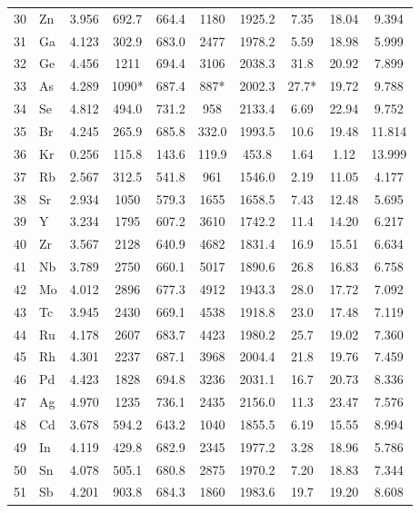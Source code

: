 \documentclass[12pt,a4paper]{article}
\theoremstyle{remark}
\begin{document}
\begin{longtable}{@{}llcccccccc@{}}
		30 & Zn  & 3.956 & 692.7  & 664.4  & 1180   & 1925.2 & 7.35  & 18.04 & 9.394 \\
		31 & Ga  & 4.123 & 302.9  & 683.0  & 2477   & 1978.2 & 5.59  & 18.98 & 5.999 \\
		32 & Ge  & 4.456 & 1211   & 694.4  & 3106   & 2038.3 & 31.8  & 20.92 & 7.899 \\
		33 & As  & 4.289 & 1090*  & 687.4  & 887*   & 2002.3 & 27.7* & 19.72 & 9.788 \\
		34 & Se  & 4.812 & 494.0  & 731.2  & 958    & 2133.4 & 6.69  & 22.94 & 9.752 \\
		35 & Br  & 4.245 & 265.9  & 685.8  & 332.0  & 1993.5 & 10.6  & 19.48 & 11.814 \\
		36 & Kr  & 0.256 & 115.8  & 143.6  & 119.9  & 453.8  & 1.64  & 1.12  & 13.999 \\
		37 & Rb  & 2.567 & 312.5  & 541.8  & 961    & 1546.0 & 2.19  & 11.05 & 4.177 \\
		38 & Sr  & 2.934 & 1050   & 579.3  & 1655   & 1658.5 & 7.43  & 12.48 & 5.695 \\
		39 & Y   & 3.234 & 1795   & 607.2  & 3610   & 1742.2 & 11.4  & 14.20 & 6.217 \\
		40 & Zr  & 3.567 & 2128   & 640.9  & 4682   & 1831.4 & 16.9  & 15.51 & 6.634 \\
		41 & Nb  & 3.789 & 2750   & 660.1  & 5017   & 1890.6 & 26.8  & 16.83 & 6.758 \\
		42 & Mo  & 4.012 & 2896   & 677.3  & 4912   & 1943.3 & 28.0  & 17.72 & 7.092 \\
		43 & Tc  & 3.945 & 2430   & 669.1  & 4538   & 1918.8 & 23.0  & 17.48 & 7.119 \\
		44 & Ru  & 4.178 & 2607   & 683.7  & 4423   & 1980.2 & 25.7  & 19.02 & 7.360 \\
		45 & Rh  & 4.301 & 2237   & 687.1  & 3968   & 2004.4 & 21.8  & 19.76 & 7.459 \\
		46 & Pd  & 4.423 & 1828   & 694.8  & 3236   & 2031.1 & 16.7  & 20.73 & 8.336 \\
		47 & Ag  & 4.970 & 1235   & 736.1  & 2435   & 2156.0 & 11.3  & 23.47 & 7.576 \\
		48 & Cd  & 3.678 & 594.2  & 643.2  & 1040   & 1855.5 & 6.19  & 15.55 & 8.994 \\
		49 & In  & 4.119 & 429.8  & 682.9  & 2345   & 1977.2 & 3.28  & 18.96 & 5.786 \\
		50 & Sn  & 4.078 & 505.1  & 680.8  & 2875   & 1970.2 & 7.20  & 18.83 & 7.344 \\
		51 & Sb  & 4.201 & 903.8  & 684.3  & 1860   & 1983.6 & 19.7  & 19.20 & 8.608 \\

\end{longtable}
\end{document}

